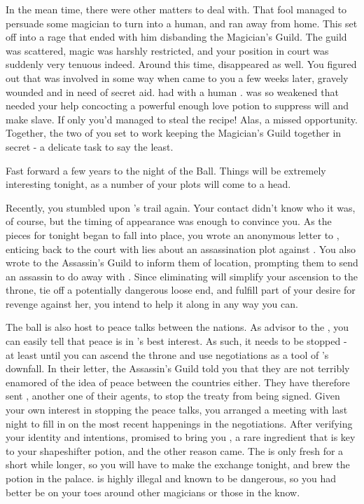 \documentclass[char]{NeptuneBall}
\begin{document}
In the mean time, there were other matters to deal with. That fool \cAriel{} managed to persuade some magician to turn \cAriel{\them} into a human, and ran away from home. This set \cKing{} off into a rage that ended with him disbanding the Magician's Guild. The guild was scattered, magic was harshly restricted, and your position in court was suddenly very tenuous indeed. Around this time, \cWitch{} disappeared as well. You figured out that \cWitch{\they} was involved in some way when \cWitch{\they} came to you a few weeks later, gravely wounded and in need of secret aid. \cWitch{\They} had with \cWitch{\them} a human \cSlave{\prince}. \cWitch{} was so weakened that \cWitch{\they} needed your help concocting a powerful enough love potion to suppress \cSlave{\their} will and make \cSlave{\them} \cWitch{\them} slave. If only you'd managed to steal the recipe! Alas, a missed opportunity. Together, the two of you set to work keeping the Magician's Guild together in secret - a delicate task to say the least.

Fast forward a few years to the night of the \cExExKing{} Ball. Things will be extremely interesting tonight, as a number of your plots will come to a head.

Recently, you stumbled upon \cQueen{}'s trail again. Your contact didn't know who it was, of course, but the timing of \cQueen{\their} appearance was enough to convince you. As the pieces for tonight began to fall into place, you wrote an anonymous letter to \cQueen{}, enticing \cQueen{\them} back to the court with lies about an assassination plot against \cKing{}. You also wrote to the Assassin's Guild to inform them of \cQueen{\their} location, prompting them to send an assassin to do away with \cQueen{}. Since eliminating \cQueen{} will simplify your ascension to the throne, tie off a potentially dangerous loose end, and fulfill part of your desire for revenge against her, you intend to help it along in any way you can.

The ball is also host to peace talks between the nations. As advisor to the \cKing{\King}, you can easily tell that peace is in \pAtlantis{}'s best interest. As such, it needs to be stopped - at least until you can ascend the throne and use negotiations as a tool of \pAtlantis{}'s downfall. In their letter, the Assassin's Guild told you that they are not terribly enamored of the idea of peace between the countries either. They have therefore sent \cSpy{}, another one of their agents, to stop the treaty from being signed. Given your own interest in stopping the peace talks, you arranged a meeting with \cSpy{\them} last night to fill \cSpy{\them} in on the most recent happenings in the negotiations. After verifying your identity and intentions, \cSpy{} promised to bring you \iHemlock{\MYname}, a rare ingredient that is key to your shapeshifter potion, and the other reason \cSpy{\they} came. The \iHemlock{\MYname} is only fresh for a short while longer, so you will have to make the exchange tonight, and brew the potion in the palace. \iHemlock{\MYname} is highly illegal and known to be dangerous, so you had better be on your toes around other magicians or those in the know.
\end{document}
